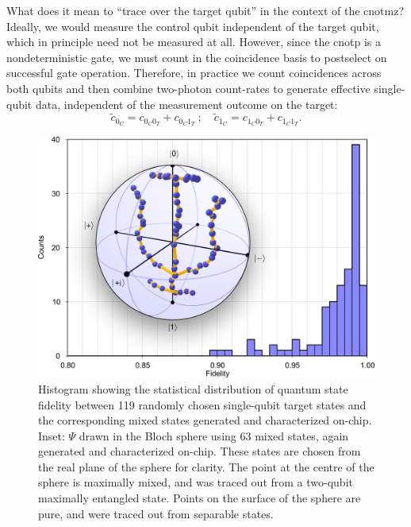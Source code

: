 What does it mean to ``trace over the target qubit'' in the context of the \gls{cnotmz}? Ideally, we would measure the control qubit independent of the target qubit, which in principle need not be measured at all. However, since the \gls{cnotp} is a nondeterministic gate, we must count in the coincidence basis to postselect on successful gate operation. Therefore, in practice we count coincidences across both qubits and then combine two-photon count-rates to generate effective single-qubit data, independent of the measurement outcome on the target:
\begin{equation}
    \tilde{c}_{0_C} = c_{0_C0_T} + c_{0_C1_T} ~; \quad 
    \tilde{c}_{1_C} = c_{1_C0_T} + c_{1_C1_T}.
\end{equation}

\begin{figure}[t!]
\centering
\includegraphics[width=.8\linewidth]{chapter3/fig/6.jpg}
\caption[Generating mixed states]{Histogram showing the statistical distribution of quantum state fidelity between 119 randomly chosen single-qubit target states and the corresponding mixed states generated and characterized on-chip. Inset: $\Psi$ drawn in the Bloch sphere using 63 mixed states, again generated and characterized on-chip. These states are chosen from the real plane of the sphere for clarity. The point at the centre of the sphere is maximally mixed, and was traced out from a two-qubit maximally entangled state. Points on the surface of the sphere are pure, and were traced out from separable states.}
\label{fig:mixedstates}
\end{figure}


